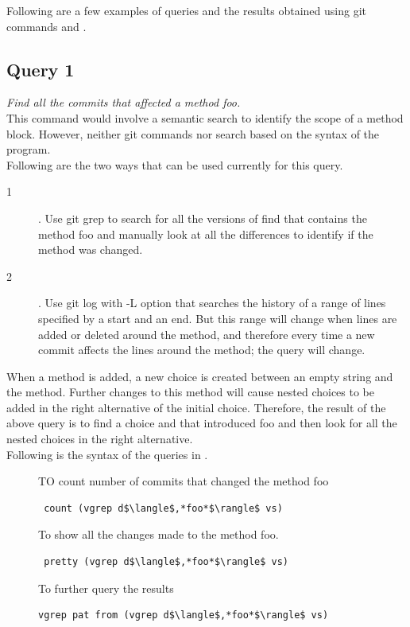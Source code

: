 Following are a few examples of queries and the results obtained using git commands and \gql.

\subsection{Query 1}
\textit{Find all the commits that affected a method foo.} \\
This command would involve a semantic search to identify the scope of a method block. However, neither git commands nor \gql search based on the syntax of the program. \\
Following are the two ways that can be used currently for this query.\\
\begin{description}
\item[1]. Use git grep to search for all the versions of find that contains the method foo and manually look at all the differences to identify if the method was changed.
\item[2]. Use git log with -L option that searches the history of a range of lines specified by a start and an end. But this range will change when lines are added or deleted around the method, and therefore every time a new commit affects the lines around the method; the query will change.
\end{description}
When a method is added, a new choice is created between an empty string and the method. Further changes to this method will cause nested choices to be added in the right alternative of the initial choice. Therefore, the result of the above query is to find a choice and that introduced foo and then look for all the nested choices in the right alternative. \\
Following is the syntax of the queries in \gql.
\begin{description}
\item[] TO count number of commits that changed the method foo %
\begin{lstlisting}
 count (vgrep d$\langle$,*foo*$\rangle$ vs)
\end{lstlisting}
\item[] To show all the changes made to the method foo.
\begin{lstlisting}
 pretty (vgrep d$\langle$,*foo*$\rangle$ vs)
\end{lstlisting}
\item[] To further query the results
\begin{lstlisting}
vgrep pat from (vgrep d$\langle$,*foo*$\rangle$ vs)
\end{lstlisting}
\end{description}

